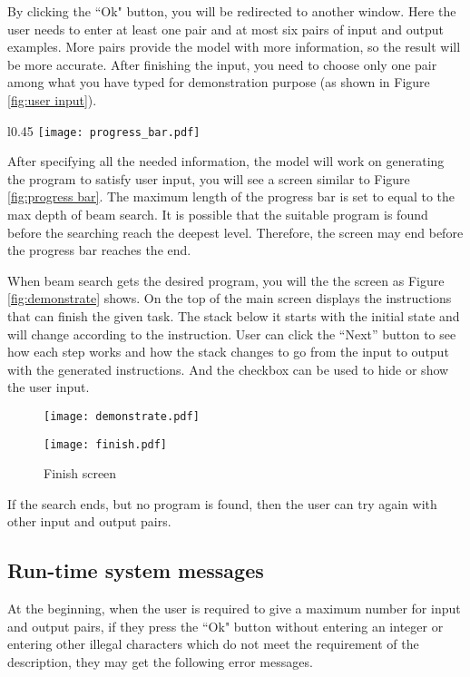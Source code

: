 By clicking the ``Ok" button, you will be redirected to another window. Here the user needs to enter at least one pair and at most six pairs of input and output examples. More pairs provide the model with more information, so the result will be more accurate. After finishing the input, you need to choose only one pair among what you have typed for demonstration purpose (as shown in Figure \ref{fig:user input}).
\begin{wrapfigure}{l}{0.45\textwidth}
    \centering
    \texttt{[image: progress\_bar.pdf]}
	\caption{Progress Bar}
	\label{fig:progress bar}
\end{wrapfigure}
After specifying all the needed information, the model will work on generating the program to satisfy user input, you will see a screen similar to Figure \ref{fig:progress bar}. The maximum length of the progress bar is set to equal to the max depth of beam search. It is possible that the suitable program is found before the searching reach the deepest level. Therefore, the screen may end before the progress bar reaches the end. 

When beam search gets the desired program, you will the the screen as Figure \ref{fig:demonstrate} shows. On the top of the main screen displays the instructions that can finish the given task. The stack below it starts with the initial state and will change according to the instruction. User can click the ``Next'' button to see how each step works and how the stack changes to go from the input to output with the generated instructions. And the checkbox can be used to hide or show the user input.

\begin{figure}[H]
  \centering
  \begin{minipage}[b]{0.43\textwidth}
    \texttt{[image: demonstrate.pdf]}
    \caption{Demonstration screen}
    \label{fig:demonstrate}
  \end{minipage}
  \hfill
  \begin{minipage}[b]{0.43\textwidth}
    \texttt{[image: finish.pdf]}
    \caption{Finish screen}
    \label{fig:finish}
  \end{minipage}
\end{figure}

If the search ends, but no program is found, then the user can try again with other input and output pairs.

\subsection{Run-time system messages}
\label{messages}
At the beginning, when the user is required to give a maximum number for input and output pairs, if they press the ``Ok" button without entering an integer or entering other illegal characters which do not meet the requirement of the description, they may get the following error messages.

